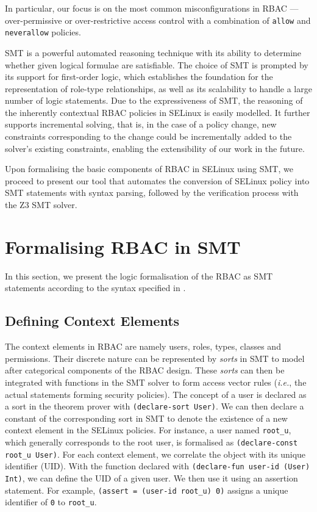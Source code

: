 \documentclass[acmsmall,screen,nonacm]{acmart}
\begin{document}
In particular, our focus is on the most common misconfigurations in RBAC --- 
over-permissive or over-restrictive access control with a combination of 
\texttt{allow} and \texttt{neverallow} policies.

SMT is a powerful automated reasoning technique with its ability to determine 
whether given logical formulae are satisfiable. The choice of SMT is prompted 
by its support for first-order logic, which establishes the foundation for the 
representation of role-type relationships, as well as its scalability to handle 
a large number of logic statements. Due to the expressiveness of SMT, the 
reasoning of the inherently contextual RBAC policies in SELinux is easily 
modelled. It further supports incremental solving, that is, in the case of a 
policy change, new constraints corresponding to the change could be 
incrementally added to the solver’s existing constraints, enabling the 
extensibility of our work in the future.

Upon formalising the basic components of RBAC in SELinux using SMT, we proceed 
to present our tool that automates the conversion of SELinux policy into SMT 
statements with syntax parsing, followed by the verification process with the 
Z3 SMT solver.

\section{Formalising RBAC in SMT}
\label{sec:formalisation}

In this section, we present the logic formalisation of the RBAC as SMT 
statements according to the syntax specified in \citet{smt-lib}.

\subsection{Defining Context Elements}
\label{sec:context}

The context elements in RBAC are namely users, roles, types, classes and 
permissions. Their discrete nature can be represented by \textit{sorts} in SMT 
to model after categorical components of the RBAC design. These \textit{sorts} 
can then be integrated with functions in the SMT solver to form access vector 
rules (\textit{i.e.}, the actual statements forming security policies). The 
concept of a user is declared as a sort in the theorem prover with 
\texttt{(declare-sort User)}. We can then declare a constant of the 
corresponding sort in SMT to denote the existence of a new context element in 
the SELinux policies. For instance, a user named \texttt{root\_u}, which 
generally corresponds to the root user, is formalised as \texttt{(declare-const 
root\_u User)}. For each context element, we correlate the object with its 
unique identifier (UID). With the function declared with \texttt{(declare-fun 
user-id (User) Int)}, we can define the UID of a given user. We then use it 
using an assertion statement. For example, \texttt{(assert = (user-id root\_u) 
0)} assigns a unique identifier of \texttt{0} to \texttt{root\_u}.
\end{document}
